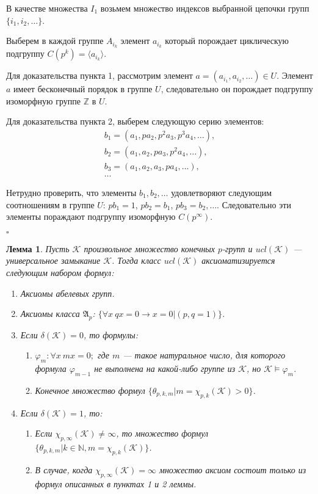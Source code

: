 \documentclass[a4paper,11pt,twoside]{article}
\newtheorem{lemma}{Лемма}[section]
\def\A{{\mathfrak{A}}}
\def\K{{\mathcal{K}}}
\def\Z{{\mathbb{Z}}}
\def\N{{\mathbb{N}}}
\begin{document}
В качестве множества $I_1$ возьмем множество индексов выбранной цепочки групп $\{i_1, i_2, \ldots\}$.

Выберем в каждой группе $A_{i_k}$ элемент $a_{i_k}$ который порождает циклическую подгруппу $C(p^k) = \langle a_{i_k}\rangle$.

Для доказательства пункта 1, рассмотрим элемент $a = (a_{i_1}, a_{i_2}, \ldots) \in U$. Элемент $a$ имеет бесконечный порядок в группе $U$, следовательно он порождает подгруппу изоморфную группе $\Z$ в $U$. 

Для доказательства пункта 2, выберем следующую серию элементов:
$$\begin{array}{l}
b_1 = (a_1, p a_2, p^2 a_3, p^3 a_4, \ldots), \\
b_2 = (a_1, a_2, p a_3, p^2 a_4, \ldots), \\
b_3 = (a_1, a_2, a_3, p a_4, \ldots), \\
\ldots
\end{array}$$

Нетрудно проверить, что элементы $b_1, b_2, \ldots$ удовлетворяют следующим соотношениям в группе $U$: $pb_1 = 1$, $pb_2 = b_1$, $pb_3 = b_2, \ldots$. Следовательно эти элементы пораждают подгруппу изоморфную $C(p^\infty)$.

$\square$


\begin{lemma}
Пусть $\K$ произвольное множество конечных $p$-групп и $ucl(\K)$ --- универсальное замыкание $\K$. Тогда класс $ucl(\K)$ аксиоматизируется следующим набором формул:
\begin{enumerate}
\item Аксиомы абелевых групп.
\item Аксиомы класса $\A_p$: $\{ \forall x \ qx = 0 \rightarrow x = 0 | (p,q = 1) \}$.
\item Если $\delta(\K) = 0$, то формулы:
\begin{enumerate}
\item $\varphi_m: \forall x \ mx = 0;$ где $m$ --- такое натуральное число, для которого формула $\varphi_{m-1}$ не выполнена на какой-либо группе из $\K$, но $\K \models \varphi_m$. 
\item Конечное множество формул $\{\theta_{p,k,m} |  m = \chi_{p,k}(\K) > 0 \}$.
\end{enumerate}
\item Если $\delta(\K) = 1$, то:
\begin{enumerate}
\item Если $\chi_{p, \infty}(\K) \neq \infty$, то множество формул $\{ \theta_{p,k,m} | k \in \N, m = \chi_{p,k}(\K)\}$.
\item В случае, когда $\chi_{p, \infty}(\K) = \infty$ множество аксиом состоит только из формул описанных в пунктах 1 и 2 леммы.
\end{enumerate}
\end{enumerate}
\end{lemma}
\end{document}
